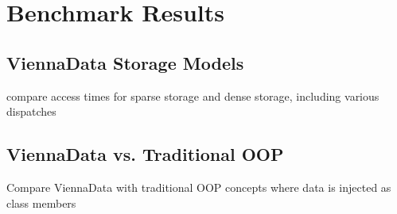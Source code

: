 \chapter{Benchmark Results} \label{chap:benchmarks}

\section{ViennaData Storage Models}
compare access times for sparse storage and dense storage, including various dispatches

\section{ViennaData vs. Traditional OOP}
Compare ViennaData with traditional OOP concepts where data is injected as class members